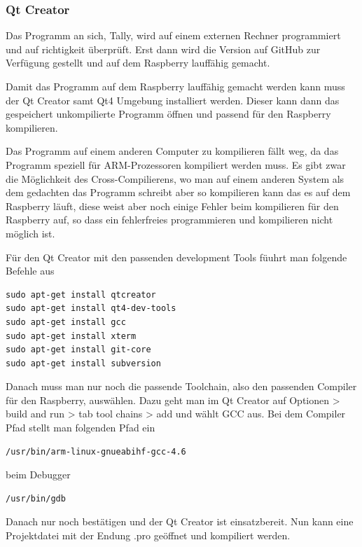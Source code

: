 \documentclass[11pt,a4paper]{article} %
\begin{document}
\subsubsection{Qt Creator}
Das Programm an sich, Tally, wird auf einem externen Rechner programmiert und auf richtigkeit überprüft. Erst dann wird die Version auf GitHub zur Verfügung gestellt und auf dem Raspberry lauffähig gemacht.
\par
Damit das Programm auf dem Raspberry lauffähig gemacht werden kann muss der Qt Creator samt Qt4 Umgebung installiert werden. Dieser kann dann das gespeichert unkompilierte Programm öffnen und passend für den Raspberry kompilieren.
\par
Das Programm auf einem anderen Computer zu kompilieren fällt weg, da das Programm speziell für ARM-Prozessoren kompiliert werden muss. Es gibt zwar die Möglichkeit des Cross-Compilierens, wo man auf einem anderen System als dem gedachten das Programm schreibt aber so kompilieren kann das es auf dem Raspberry läuft, diese weist aber noch einige Fehler beim kompilieren für den Raspberry auf, so dass ein fehlerfreies programmieren und kompilieren nicht möglich ist.
\par
Für den Qt Creator mit den passenden development Tools füuhrt man folgende Befehle aus
 \begin{frame}

\begin{lstlisting}
sudo apt-get install qtcreator
sudo apt-get install qt4-dev-tools
sudo apt-get install gcc
sudo apt-get install xterm
sudo apt-get install git-core
sudo apt-get install subversion
\end{lstlisting}

\end{frame}
\newpage
Danach muss man nur noch die passende Toolchain, also den passenden Compiler für den Raspberry, auswählen. Dazu geht man im Qt Creator auf Optionen > build and run > tab tool chains > add und wählt GCC aus. Bei dem Compiler Pfad stellt man folgenden Pfad ein
\begin{frame}

\begin{lstlisting}
/usr/bin/arm-linux-gnueabihf-gcc-4.6 
\end{lstlisting}

\end{frame} 
beim Debugger
  \begin{frame}

\begin{lstlisting}
/usr/bin/gdb
\end{lstlisting}

\end{frame}
Danach nur noch bestätigen und der Qt Creator ist einsatzbereit. Nun kann eine Projektdatei mit der Endung .pro geöffnet und kompiliert werden.
\cite{4}
\par
\end{document}
